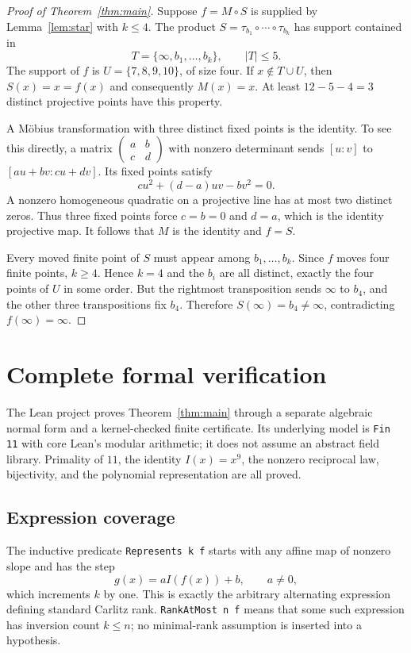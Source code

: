 \documentclass[11pt]{article}
\begin{document}
\begin{proof}[Proof of Theorem~\ref{thm:main}]
Suppose $f=M\circ S$ is supplied by Lemma~\ref{lem:star} with $k\le4$. The product $S=\tau_{b_1}\circ\cdots\circ\tau_{b_k}$ has support contained in
\[
 T=\{\infty,b_1,\ldots,b_k\},\qquad |T|\le5.
\]
The support of $f$ is $U=\{7,8,9,10\}$, of size four. If $x\notin T\cup U$, then $S(x)=x=f(x)$ and consequently $M(x)=x$. At least $12-5-4=3$ distinct projective points have this property.

A M\"obius transformation with three distinct fixed points is the identity. To see this directly, a matrix $\left(\begin{smallmatrix}a&b\\c&d\end{smallmatrix}\right)$ with nonzero determinant sends $[u:v]$ to $[au+bv:cu+dv]$. Its fixed points satisfy
\[
 cu^2+(d-a)uv-bv^2=0.
\]
A nonzero homogeneous quadratic on a projective line has at most two distinct zeros. Thus three fixed points force $c=b=0$ and $d=a$, which is the identity projective map. It follows that $M$ is the identity and $f=S$.

Every moved finite point of $S$ must appear among $b_1,\ldots,b_k$. Since $f$ moves four finite points, $k\ge4$. Hence $k=4$ and the $b_i$ are all distinct, exactly the four points of $U$ in some order. But the rightmost transposition sends $\infty$ to $b_4$, and the other three transpositions fix $b_4$. Therefore $S(\infty)=b_4\ne\infty$, contradicting $f(\infty)=\infty$.
\end{proof}

\section{Complete formal verification}
The Lean project proves Theorem~\ref{thm:main} through a separate algebraic normal form and a kernel-checked finite certificate. Its underlying model is \texttt{Fin 11} with core Lean's modular arithmetic; it does not assume an abstract field library. Primality of $11$, the identity $I(x)=x^9$, the nonzero reciprocal law, bijectivity, and the polynomial representation are all proved.

\subsection{Expression coverage}
The inductive predicate \texttt{Represents k f} starts with any affine map of nonzero slope and has the step
\[
 g(x)=aI(f(x))+b,\qquad a\ne0,
\]
which increments $k$ by one. This is exactly the arbitrary alternating expression defining standard Carlitz rank. \texttt{RankAtMost n f} means that some such expression has inversion count $k\le n$; no minimal-rank assumption is inserted into a hypothesis.
\end{document}
